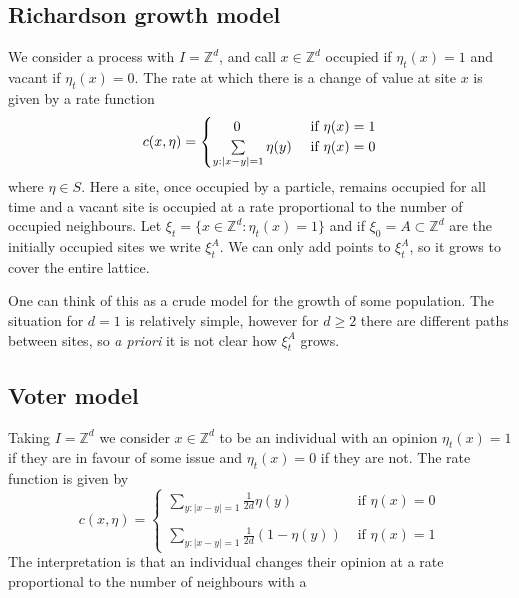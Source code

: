 \documentclass[11pt,a2paper,landscape]{article}
\begin{document}
\begin{multicols*}{3}
{\subsection*{Richardson growth model}
We consider a process with $I= \mathbb{Z}^d$, and call $x \in \mathbb{Z}^{d}$ occupied if $\eta_{t}(x)=1$
and vacant if $\eta_{t}(x)=0$. The rate at which there is a change of value at site $x$ is given by a rate function
\begin{equation*}
c(x, \eta)=
\begin{cases}
\mbox{\phantom{ZZ.}}0 & \mbox{ if } \eta(x)=1\\
\sum\limits_{y: |x-y|=1}\eta(y) & \mbox{ if } \eta(x)=0 
\end{cases}
\end{equation*}
where $\eta \in S$. Here a site, once occupied by a particle, remains occupied for all time and a vacant site is
occupied at a rate proportional to the number of occupied neighbours. 
Let $\xi_{t} = \{x \in \mathbb{Z}^{d}: \eta_{t}(x)=1\}$ and if $\xi_{0}=A\subset \mathbb{Z}^{d}$ 
are the initially occupied sites we write $\xi_{t}^{A}$. We can only add points to $\xi_{t}^{A}$, 
so it grows to cover the entire lattice.
\vspace{1ex}

One can think of this as a crude model for the growth of some population.
The situation for $d=1$ is relatively simple, however for $d \geq 2$ there are different paths 
between sites, so \textit{a priori} it is not clear how $\xi_{t}^{A}$ grows.

\subsection*{Voter model}
Taking $I= \mathbb{Z}^{d}$ we consider $x \in \mathbb{Z}^{d}$ to be an individual with an opinion $\eta_{t}(x)=1$
if they are in favour of some issue and $\eta_{t}(x)=0$ if they are not. The rate function is given by
\begin{equation*}
c(x, \eta)=
\begin{cases}
\sum\limits_{y: |x-y|=1}\frac{1}{2d}\eta(y) & \mbox{ if } \eta(x)=0\\
\\
\sum\limits_{y: |x-y|=1}\frac{1}{2d}(1-\eta(y)) & \mbox{ if } \eta(x)=1
\end{cases}
\end{equation*}
The interpretation is that an individual changes their opinion at a rate proportional to the number
of neighbours with a 

}
\end{multicols*}
\end{document}
